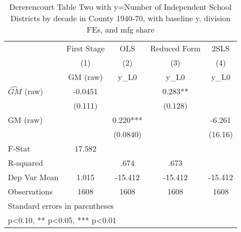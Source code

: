 \begin{table}[htbp]\centering
\def\sym#1{\ifmmode^{#1}\else\(^{#1}\)\fi}
\caption{Dererencourt Table Two with y=Number of Independent School Districts by decade in County 1940-70, with baseline y, division FEs, and mfg share}
\begin{tabular}{l*{4}{c}}
\toprule
                    & First Stage   &         OLS   &Reduced Form   &        2SLS   \\
                    &\multicolumn{1}{c}{(1)}&\multicolumn{1}{c}{(2)}&\multicolumn{1}{c}{(3)}&\multicolumn{1}{c}{(4)}\\
                    &\multicolumn{1}{c}{GM  (raw)}&\multicolumn{1}{c}{y\_L0}&\multicolumn{1}{c}{y\_L0}&\multicolumn{1}{c}{y\_L0}\\
\midrule
$\hat{GM}$ (raw)    &     -0.0451   &               &       0.283** &               \\
                    &     (0.111)   &               &     (0.128)   &               \\
\addlinespace
GM  (raw)           &               &       0.220***&               &      -6.261   \\
                    &               &    (0.0840)   &               &     (16.16)   \\
\midrule
F-Stat              &      17.582   &               &               &               \\
R-squared           &               &        .674   &        .673   &               \\
Dep Var Mean        &       1.015   &     -15.412   &     -15.412   &     -15.412   \\
Observations        &        1608   &        1608   &        1608   &        1608   \\
\bottomrule
\multicolumn{5}{l}{\footnotesize Standard errors in parentheses}\\
\multicolumn{5}{l}{\footnotesize * p<0.10, ** p<0.05, *** p<0.01}\\
\end{tabular}
\end{table}
